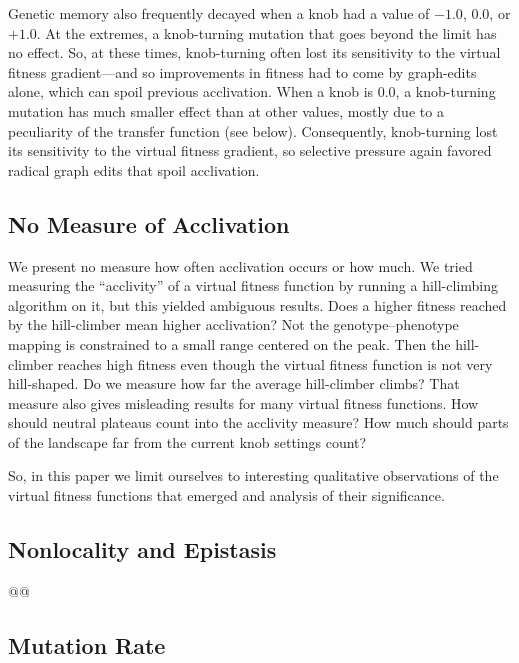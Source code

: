 \documentclass[letterpaper]{article}
\begin{document}
Genetic memory also frequently decayed when a knob had a value of $-1.0$,
$0.0$, or $+1.0$. At the extremes, a knob-turning mutation that goes beyond the
limit has no effect. So, at these times, knob-turning often lost its
sensitivity to the virtual fitness gradient---and so improvements in fitness
had to come by graph-edits alone, which can spoil previous acclivation. When a
knob is 0.0, a knob-turning mutation has much smaller effect than at other
values, mostly due to a peculiarity of the transfer function (see below).
Consequently, knob-turning lost its sensitivity to the virtual fitness
gradient, so selective pressure again favored radical graph edits that spoil
acclivation.

\subsection{No Measure of Acclivation}

We present no measure how often acclivation occurs or how much. We tried
measuring the ``acclivity'' of a virtual fitness function by running a
hill-climbing algorithm on it, but this yielded ambiguous results. Does a
higher fitness reached by the hill-climber mean higher acclivation? Not the
genotype--phenotype mapping is constrained to a small range centered on the
peak. Then the hill-climber reaches high fitness even though the virtual
fitness function is not very hill-shaped. Do we measure how far the average
hill-climber climbs?  That measure also gives misleading results for many
virtual fitness functions. How should neutral plateaus count into the acclivity
measure? How much should parts of the landscape far from the current knob
settings count?

So, in this paper we limit ourselves to interesting qualitative observations
of the virtual fitness functions that emerged and analysis of their
significance.

\subsection{Nonlocality and Epistasis}

@@

\subsection{Mutation Rate}
\end{document}
